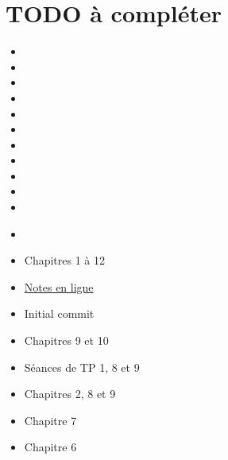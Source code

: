 \section{TODO à compléter \textcolor{red}{\danger}}
\begin{itemize}
  \item {}
  \item {}
  \item {}
  \item {}
  \item {}
  \item {}
  \item {}
  \item {}
  \item {}
  \item {}
  \item {}
  \item {}\\
\end{itemize}
\noindent
{}
  \begin{itemize}
    \item Chapitres 1 à 12
    \item \href{https://dl.dropboxusercontent.com/u/44092863/Graph_Theory_Romain_Capron.pdf}{Notes en ligne}     
  \end{itemize}
  \begin{itemize} 
    \item Initial commit
    \item Chapitres 9 et 10
    \item Séances de TP 1, 8 et 9
  \end{itemize}
  \begin{itemize}
    \item Chapitres 2, 8 et 9
  \end{itemize}
  \begin{itemize}
    \item Chapitre 7
  \end{itemize}
  \begin{itemize}
    \item Chapitre 6
  \end{itemize}
